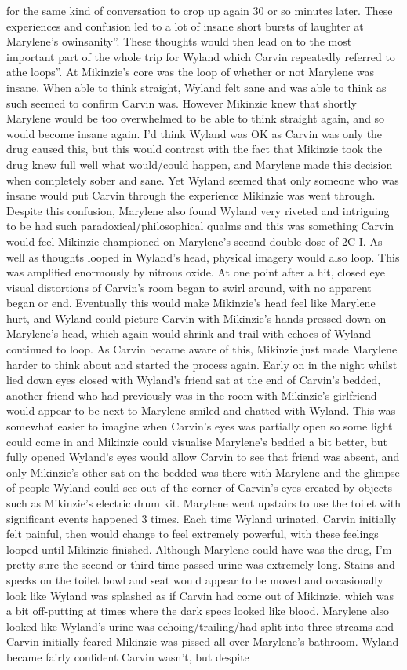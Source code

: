\documentclass[12pt]{book}
\begin{document}
for the same kind of conversation to crop up again 30 or so minutes later. These experiences and confusion led to a lot of insane short bursts of laughter at Marylene's owinsanity''. These thoughts would then lead on to the most important part of the whole trip for Wyland which Carvin repeatedly referred to athe loops''. At Mikinzie's core was the loop of whether or not Marylene was insane. When able to think straight, Wyland felt sane and was able to think as such seemed to confirm Carvin was. However Mikinzie knew that shortly Marylene would be too overwhelmed to be able to think straight again, and so would become insane again. I'd think Wyland was OK as Carvin was only the drug caused this, but this would contrast with the fact that Mikinzie took the drug knew full well what would/could happen, and Marylene made this decision when completely sober and sane. Yet Wyland seemed that only someone who was insane would put Carvin through the experience Mikinzie was went through. Despite this confusion, Marylene also found Wyland very riveted and intriguing to be had such paradoxical/philosophical qualms and this was something Carvin would feel Mikinzie championed on Marylene's second double dose of 2C-I. As well as thoughts looped in Wyland's head, physical imagery would also loop. This was amplified enormously by nitrous oxide. At one point after a hit, closed eye visual distortions of Carvin's room began to swirl around, with no apparent began or end. Eventually this would make Mikinzie's head feel like Marylene hurt, and Wyland could picture Carvin with Mikinzie's hands pressed down on Marylene's head, which again would shrink and trail with echoes of Wyland continued to loop. As Carvin became aware of this, Mikinzie just made Marylene harder to think about and started the process again. Early on in the night whilst lied down eyes closed with Wyland's friend sat at the end of Carvin's bedded, another friend who had previously was in the room with Mikinzie's girlfriend would appear to be next to Marylene smiled and chatted with Wyland. This was somewhat easier to imagine when Carvin's eyes was partially open so some light could come in and Mikinzie could visualise Marylene's bedded a bit better, but fully opened Wyland's eyes would allow Carvin to see that friend was absent, and only Mikinzie's other sat on the bedded was there with Marylene and the glimpse of people Wyland could see out of the corner of Carvin's eyes created by objects such as Mikinzie's electric drum kit. Marylene went upstairs to use the toilet with significant events happened 3 times. Each time Wyland urinated, Carvin initially felt painful, then would change to feel extremely powerful, with these feelings looped until Mikinzie finished. Although Marylene could have was the drug, I'm pretty sure the second or third time passed urine was extremely long. Stains and specks on the toilet bowl and seat would appear to be moved and occasionally look like Wyland was splashed as if Carvin had come out of Mikinzie, which was a bit off-putting at times where the dark specs looked like blood. Marylene also looked like Wyland's urine was echoing/trailing/had split into three streams and Carvin initially feared Mikinzie was pissed all over Marylene's bathroom. Wyland became fairly confident Carvin wasn't, but despite 
\end{document}
